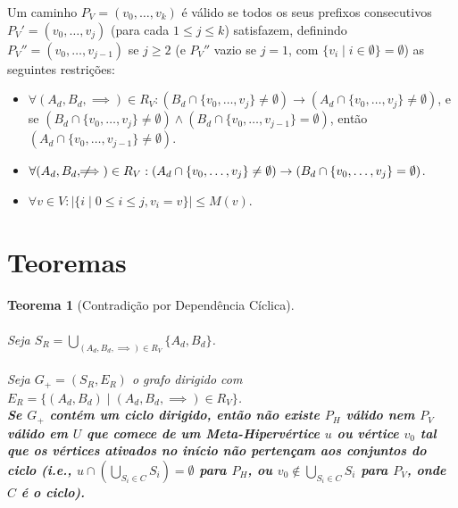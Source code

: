 \documentclass{article}
\newtheorem{theorem}{Teorema}
\begin{document}
Um caminho \( P_V = (v_0, \dots, v_k) \) é válido se todos os seus prefixos consecutivos \( P_V' = (v_0, \dots, v_j) \) (para cada \( 1 \leq j \leq k \)) satisfazem, definindo \( P_V'' = (v_0, \dots, v_{j-1}) \) se \( j \geq 2 \) (e \( P_V'' \) vazio se \( j = 1 \), com \( \{v_i \mid i \in \emptyset \} = \emptyset \)) as seguintes restrições:

\begin{itemize}
    \item \( \forall (A_d, B_d, \implies) \in R_V: (B_d \cap \{v_0, \dots, v_j\} \neq \emptyset) \to (A_d \cap \{v_0, \dots, v_j\} \neq \emptyset) \), e se \( (B_d \cap \{v_0, \dots, v_j\} \neq \emptyset) \wedge (B_d \cap \{v_0, \dots, v_{j-1}\} = \emptyset) \), então \( (A_d \cap \{v_0, \dots, v_{j-1}\} \neq \emptyset) \).
    \item \( \forall (A_d, B_d, \not\!\!\!\implies) \in R_V: (A_d \cap \{v_0, \dots, v_j\} \neq \emptyset) \to (B_d \cap \{v_0, \dots, v_j\} = \emptyset) \).
    \item \( \forall v \in V: |\{ i \mid 0 \leq i \leq j, v_i = v \}| \leq M(v) \).
\end{itemize}

\section{Teoremas}

\begin{theorem}[Contradição por Dependência Cíclica]
\hfill
\\
\\
Seja \( S_R = \bigcup_{(A_d, B_d, \implies) \in R_V} \{ A_d, B_d \} \).
\\
\\
Seja \( G_{+} = (S_R, E_R) \) o grafo dirigido com \( E_R = \{ (A_d, B_d) \mid (A_d, B_d, \implies) \in R_V \} \).
\\

\textbf{Se \( G_{+} \) contém um ciclo dirigido, então não existe \( P_H \) válido nem \( P_V \) válido em \( U \) que comece de um Meta-Hipervértice \( u \) ou vértice \( v_0 \) tal que os vértices ativados no início não pertençam aos conjuntos do ciclo (i.e., \( u \cap \left( \bigcup_{S_i \in C} S_i \right) = \emptyset \) para \( P_H \), ou \( v_0 \notin \bigcup_{S_i \in C} S_i \) para \( P_V \), onde \( C \) é o ciclo).}
\end{theorem}
\end{document}
